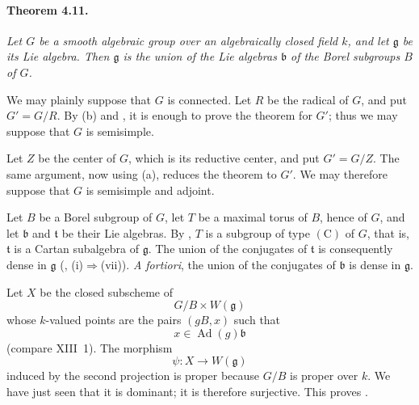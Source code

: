 

\paragraph{\textbf{Theorem 4.11.}}
{\itshape Let \(G\) be a smooth algebraic group over an
algebraically closed field \(k\), and let \(\mathfrak g\) be its
Lie algebra. Then \(\mathfrak g\) is the union of the Lie algebras
\(\mathfrak b\) of the Borel subgroups \(B\) of \(G\).}

We may plainly suppose that \(G\) is connected. Let \(R\) be the
radical of \(G\), and put \(G'=G/R\). By \textup{(b)} and ,
it is enough to prove the theorem for \(G'\); thus we may suppose
that \(G\) is semisimple.

Let \(Z\) be the center of \(G\), which is its reductive center, and
put \(G'=G/Z\). The same argument, now using \textup{(a)},
reduces the theorem to \(G'\). We may therefore suppose that \(G\)
is semisimple and adjoint.

Let \(B\) be a Borel subgroup of \(G\), let \(T\) be a maximal torus
of \(B\), hence of \(G\), and let \(\mathfrak b\) and
\(\mathfrak t\) be their Lie algebras. By , \(T\) is a subgroup
of type \((\mathrm C)\) of \(G\), that is, \(\mathfrak t\) is a
Cartan subalgebra of \(\mathfrak g\). The union of the conjugates
of \(\mathfrak t\) is consequently dense in \(\mathfrak g\)
\textup{(, \textup{(i)}\(\Rightarrow\)\textup{(vii)})}.
\emph{A fortiori}, the union of the conjugates of \(\mathfrak b\)
is dense in \(\mathfrak g\).

Let \(X\) be the closed subscheme of
\[
  G/B\times W(\mathfrak g)
\]
whose \(k\)-valued points are the pairs \((gB,x)\) such that
\[
  x\in\operatorname{Ad}(g)\mathfrak b
\]
\textup{(compare XIII~1)}. The morphism
\[
  \psi\colon X\longrightarrow W(\mathfrak g)
\]
induced by the second projection is proper because \(G/B\) is
proper over \(k\). We have just seen that it is dominant; it is
therefore surjective. This proves .


